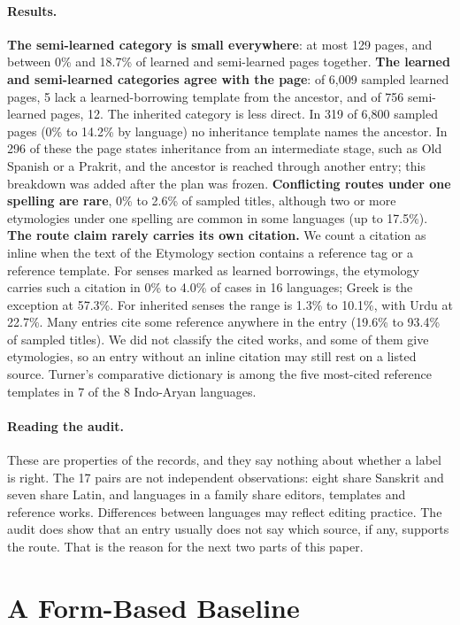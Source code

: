 \documentclass[11pt]{article}
\begin{document}
\paragraph{Results.} \textbf{The semi-learned category is small everywhere}: at most 129 pages, and between 0\% and 18.7\% of learned and semi-learned pages together. \textbf{The learned and semi-learned categories agree with the page}: of 6,009 sampled learned pages, 5 lack a learned-borrowing template from the ancestor, and of 756 semi-learned pages, 12. The inherited category is less direct. In 319 of 6,800 sampled pages (0\% to 14.2\% by language) no inheritance template names the ancestor. In 296 of these the page states inheritance from an intermediate stage, such as Old Spanish or a Prakrit, and the ancestor is reached through another entry; this breakdown was added after the plan was frozen. \textbf{Conflicting routes under one spelling are rare}, 0\% to 2.6\% of sampled titles, although two or more etymologies under one spelling are common in some languages (up to 17.5\%). \textbf{The route claim rarely carries its own citation.} We count a citation as inline when the text of the Etymology section contains a reference tag or a reference template. For senses marked as learned borrowings, the etymology carries such a citation in 0\% to 4.0\% of cases in 16 languages; Greek is the exception at 57.3\%. For inherited senses the range is 1.3\% to 10.1\%, with Urdu at 22.7\%. Many entries cite some reference anywhere in the entry (19.6\% to 93.4\% of sampled titles). We did not classify the cited works, and some of them give etymologies, so an entry without an inline citation may still rest on a listed source. Turner's comparative dictionary is among the five most-cited reference templates in 7 of the 8 Indo-Aryan languages.

\paragraph{Reading the audit.} These are properties of the records, and they say nothing about whether a label is right. The 17 pairs are not independent observations: eight share Sanskrit and seven share Latin, and languages in a family share editors, templates and reference works. Differences between languages may reflect editing practice. The audit does show that an entry usually does not say which source, if any, supports the route. That is the reason for the next two parts of this paper.

\section{A Form-Based Baseline}
\label{sec:baseline}
\end{document}

